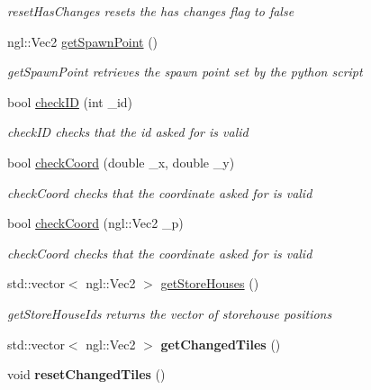 \begin{DoxyCompactItemize}
\begin{DoxyCompactList}\small\item\em reset\+Has\+Changes resets the has changes flag to false \end{DoxyCompactList}\item 
ngl\+::\+Vec2 \hyperlink{class_grid_a943153054fb09f6b5fa3aa1f55037ef5}{get\+Spawn\+Point} ()
\begin{DoxyCompactList}\small\item\em get\+Spawn\+Point retrieves the spawn point set by the python script \end{DoxyCompactList}\item 
bool \hyperlink{class_grid_aae6d8f0a0674d84bd1cd025283170634}{check\+I\+D} (int \+\_\+id)
\begin{DoxyCompactList}\small\item\em check\+I\+D checks that the id asked for is valid \end{DoxyCompactList}\item 
bool \hyperlink{class_grid_a00195f02ce6c6815e283ee7cf66ff5da}{check\+Coord} (double \+\_\+x, double \+\_\+y)
\begin{DoxyCompactList}\small\item\em check\+Coord checks that the coordinate asked for is valid \end{DoxyCompactList}\item 
bool \hyperlink{class_grid_ab8ba8c914145187f720a1d1f4a73552a}{check\+Coord} (ngl\+::\+Vec2 \+\_\+p)
\begin{DoxyCompactList}\small\item\em check\+Coord checks that the coordinate asked for is valid \end{DoxyCompactList}\item 
std\+::vector$<$ ngl\+::\+Vec2 $>$ \hyperlink{class_grid_a93fefe7048f80ba8166cda07b915b225}{get\+Store\+Houses} ()
\begin{DoxyCompactList}\small\item\em get\+Store\+House\+Ids returns the vector of storehouse positions \end{DoxyCompactList}\item 
\hypertarget{class_grid_ab8e5a859cb7fc0e6395958d1b3c824f7}{}std\+::vector$<$ ngl\+::\+Vec2 $>$ {\bfseries get\+Changed\+Tiles} ()\label{class_grid_ab8e5a859cb7fc0e6395958d1b3c824f7}

\item 
\hypertarget{class_grid_afe0ea9252eaf09643cc6ef472123e994}{}void {\bfseries reset\+Changed\+Tiles} ()\label{class_grid_afe0ea9252eaf09643cc6ef472123e994}

\end{DoxyCompactItemize}


